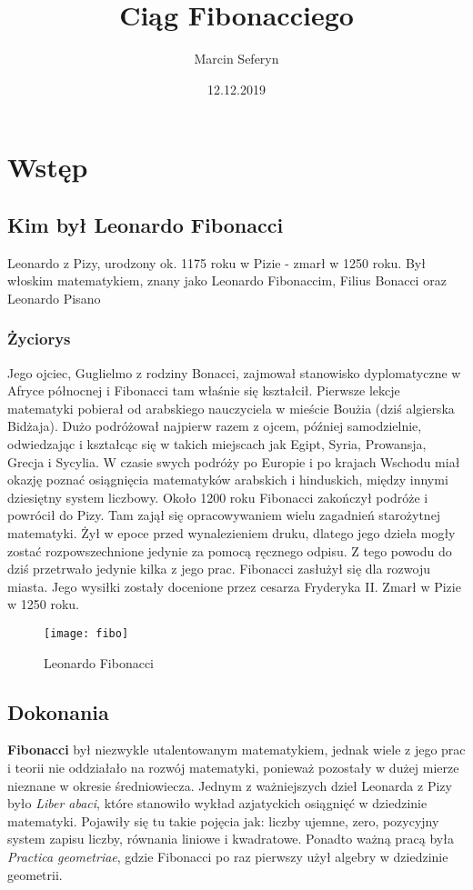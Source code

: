 \documentclass{report}
\title{Ciąg Fibonacciego}
\author{Marcin Seferyn}
\date{12.12.2019}
\begin{document}
\maketitle
\newpage
\tableofcontents
\newpage
\chapter{Wstęp}
\section{Kim był Leonardo Fibonacci}
\cite{fib}
Leonardo z Pizy, urodzony ok. 1175 roku w Pizie - zmarł w 1250 roku. Był włoskim matematykiem, znany jako Leonardo Fibonaccim, Filius Bonacci oraz Leonardo Pisano
\subsection{Życiorys}
\cite{fib2}
Jego ojciec, Guglielmo z rodziny Bonacci, zajmował stanowisko dyplomatyczne w Afryce północnej i Fibonacci tam właśnie się kształcił. Pierwsze lekcje matematyki pobierał od arabskiego nauczyciela w mieście Boużia (dziś algierska Bidżaja). Dużo podróżował najpierw razem z ojcem, później samodzielnie, odwiedzając i kształcąc się w takich miejscach jak Egipt, Syria, Prowansja, Grecja i Sycylia. W czasie swych podróży po Europie i po krajach Wschodu miał okazję poznać osiągnięcia matematyków arabskich i hinduskich, między innymi dziesiętny system liczbowy.
Około 1200 roku Fibonacci zakończył podróże i powrócił do Pizy.
Tam zajął się opracowywaniem wielu zagadnień starożytnej matematyki. Żył w epoce przed wynalezieniem druku, dlatego jego dzieła mogły zostać rozpowszechnione jedynie za pomocą ręcznego odpisu. Z tego powodu do dziś przetrwało jedynie kilka z jego prac.
Fibonacci zasłużył się dla rozwoju miasta. Jego wysiłki zostały docenione przez cesarza Fryderyka II. Zmarł w Pizie w 1250 roku.


\begin{figure}[h]
\center
\texttt{[image: fibo]}
\caption{Leonardo Fibonacci}
\end{figure}
\newpage
\section{Dokonania}
\cite{fib3}
\textbf{Fibonacci} był niezwykle utalentowanym matematykiem, jednak wiele z jego prac i teorii nie oddziałało na rozwój matematyki, ponieważ pozostały w dużej mierze nieznane w okresie średniowiecza.
Jednym z ważniejszych dzieł Leonarda z Pizy było \textit{Liber abaci}, które stanowiło wykład azjatyckich osiągnięć w dziedzinie matematyki. Pojawiły się tu takie pojęcia jak: liczby ujemne, zero, pozycyjny system zapisu liczby, równania liniowe i kwadratowe.
Ponadto ważną pracą była \textit{Practica geometriae}, gdzie Fibonacci po raz pierwszy użył algebry w dziedzinie geometrii.
\end{document}
